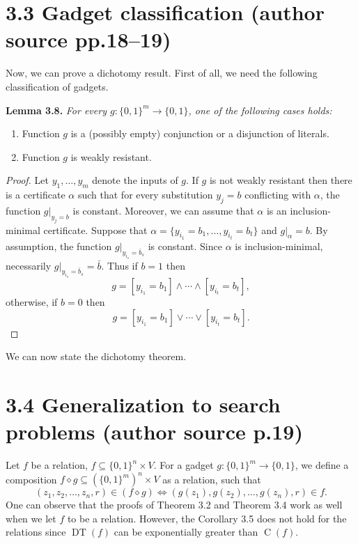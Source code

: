 \documentclass[10pt,a4paper]{article}
\newcommand{\bits}{\{0,1\}}
\newcommand{\DT}{\operatorname{DT}}
\newcommand{\CC}{\operatorname C}
\newcommand{\comp}{\diamond}
\newenvironment{originalresult}[1]{\par\medskip\noindent\textbf{#1.}\itshape}{\par\medskip}
\begin{document}
\section*{3.3 Gadget classification (author source pp.18--19)}
Now, we can prove a dichotomy result. First of all, we need the following classification of gadgets.
\begin{originalresult}{Lemma 3.8}
For every $g:\bits^m\to\bits$, one of the following cases holds:
\begin{enumerate}
\item[(i)] Function $g$ is a (possibly empty) conjunction or a disjunction of literals.
\item[(ii)] Function $g$ is weakly resistant.
\end{enumerate}
\end{originalresult}
\begin{proof}
Let $y_1,\ldots,y_m$ denote the inputs of $g$. If $g$ is not weakly resistant then there is a certificate $\alpha$ such that for every substitution $y_j=b$ conflicting with $\alpha$, the function $g|_{y_j=b}$ is constant. Moreover, we can assume that $\alpha$ is an inclusion-minimal certificate.
Suppose that $\alpha=\{y_{i_1}=b_1,\ldots,y_{i_t}=b_t\}$ and $g|_\alpha=b$. By assumption, the function $g|_{y_{i_s}=\bar b_s}$ is constant. Since $\alpha$ is inclusion-minimal, necessarily $g|_{y_{i_s}=\bar b_s}=\bar b$. Thus if $b=1$ then
\[g=[y_{i_1}=b_1]\wedge\cdots\wedge[y_{i_t}=b_t],\]
otherwise, if $b=0$ then
\[g=[y_{i_1}=b_1]\vee\cdots\vee[y_{i_t}=b_t].\]
\end{proof}
We can now state the dichotomy theorem.

\section*{3.4 Generalization to search problems (author source p.19)}
Let $f$ be a relation, $f\subseteq\bits^n\times V$. For a gadget $g:\bits^m\to\bits$, we define a composition $f\comp g\subseteq(\bits^m)^n\times V$ as a relation, such that
\[(z_1,z_2,\ldots,z_n,r)\in(f\comp g)\iff(g(z_1),g(z_2),\ldots,g(z_n),r)\in f.\]
One can observe that the proofs of Theorem 3.2 and Theorem 3.4 work as well when we let $f$ to be a relation. However, the Corollary 3.5 does not hold for the relations since $\DT(f)$ can be exponentially greater than $\CC(f)$.
\end{document}
